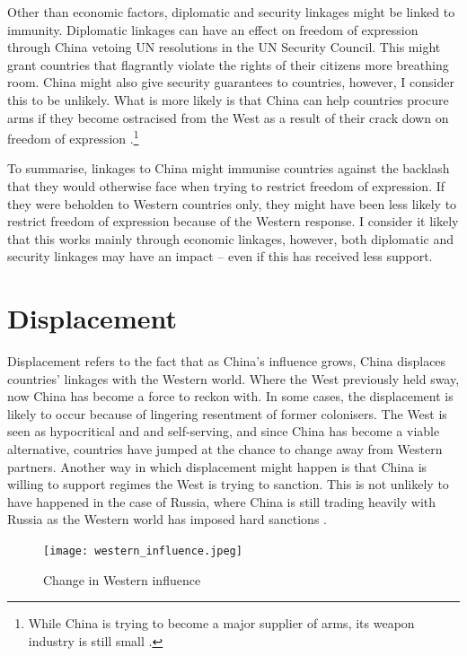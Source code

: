 Other than economic factors, diplomatic and security linkages might be linked to immunity. Diplomatic linkages can have an effect on freedom of expression through China vetoing UN resolutions in the UN Security Council. This might grant countries that flagrantly violate the rights of their citizens more breathing room. China might also give security guarantees to countries, however, I consider this to be unlikely. What is more likely is that China can help countries procure arms if they become ostracised from the West as a result of their crack down on freedom of expression \citep{george_trends_2025, gunter_chinas_2024}.\footnote{While China is trying to become a major supplier of arms, its weapon industry is still small \citep{gunter_chinas_2024}.}

To summarise, linkages to China might immunise countries against the backlash that they would otherwise face when trying to restrict freedom of expression. If they were beholden to Western countries only, they might have been less likely to restrict freedom of expression because of the Western response. I consider it likely that this works mainly through economic linkages, however, both diplomatic and security linkages may have an impact -- even if this has received less support.

\section{Displacement}
Displacement refers to the fact that as China's influence grows, China displaces countries' linkages with the Western world. Where the West previously held sway, now China has become a force to reckon with. In some cases, the displacement is likely to occur because of lingering resentment of former colonisers. The West is seen as hypocritical and and self-serving, and since China has become a viable alternative, countries have jumped at the chance to change away from Western partners. Another way in which displacement might happen is that China is willing to support regimes the West is trying to sanction. This is not unlikely to have happened in the case of Russia, where China is still trading heavily with Russia as the Western world has imposed hard sanctions \citep{beijing_newsroom_china-russia_2025}.

\begin{figure}[hbt!]
\centering
\texttt{[image: western\_influence.jpeg]}
\caption{Change in Western influence}
\label{fig:west}
\end{figure}

